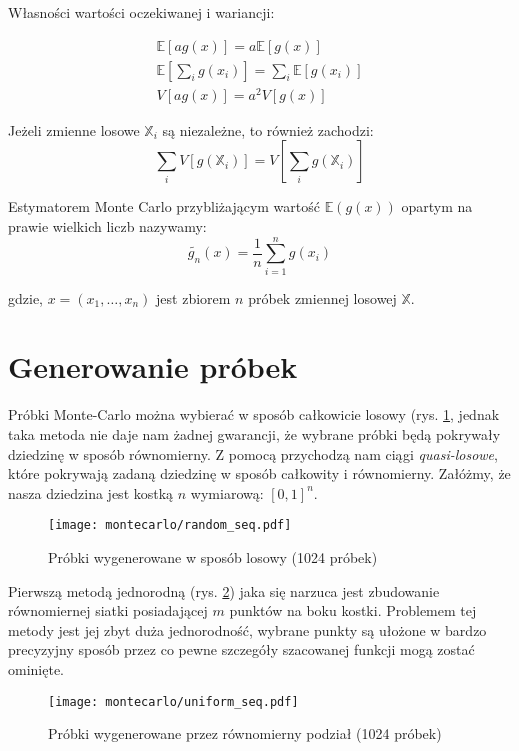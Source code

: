 \documentclass[../main.tex]{subfiles}
\begin{document}
Własności wartości oczekiwanej i wariancji:

\begin{gather*}
\mathbb{E}\left[ag(x)\right] = a \mathbb{E} \left[g(x)\right] \\
\mathbb{E}\left[\sum_{i} g(x_i)\right] = \sum_{i} \mathbb{E} \left[g(x_i)\right] \\
V\left[ ag(x) \right] = a^2 V\left[g(x)\right]
\end{gather*}

Jeżeli zmienne losowe $\mathbb{X}_i$ są niezależne, to również zachodzi:
\[
\sum_{i} V \left[
	g(\mathbb{X}_i)
\right]
=
V \left[
	\sum_{i} g(\mathbb{X}_i)
\right]
\]

Estymatorem Monte Carlo przybliżającym wartość $\mathbb{E}(g(x))$ opartym na
prawie wielkich liczb nazywamy:
\[
\widetilde{g_n}(x) =
	\frac{1}{n}
	\sum_{i=1}^{n}g(x_i)
\]

\noindent gdzie, $x=(x_1, \ldots, x_n)$ jest zbiorem $n$ próbek zmiennej
losowej $\mathbb{X}$.

\section{Generowanie próbek}

Próbki Monte-Carlo można wybierać w sposób całkowicie losowy (rys.
\ref{fig:RandomSamples}, jednak taka metoda nie daje nam żadnej gwarancji, że
wybrane próbki będą pokrywały dziedzinę w sposób równomierny. Z pomocą
przychodzą nam ciągi \textit{quasi-losowe}, które pokrywają zadaną dziedzinę w
sposób całkowity i równomierny. Załóżmy, że nasza dziedzina jest kostką $n$
wymiarową: $[0,1]^{n}$.

\begin{figure}[h]
  \centering
  \texttt{[image: montecarlo/random\_seq.pdf]}
  \caption{Próbki wygenerowane w sposób losowy (1024 próbek)}
  \label{fig:RandomSamples}
\end{figure}

Pierwszą metodą jednorodną (rys. \ref{fig:UniformSamples}) jaka się narzuca jest zbudowanie równomiernej siatki posiadającej $m$ punktów na boku kostki. Problemem tej metody jest jej zbyt duża jednorodność, wybrane punkty są ułożone w bardzo precyzyjny sposób przez co pewne szczegóły szacowanej funkcji mogą zostać ominięte.

\begin{figure}[h]
  \centering
  \texttt{[image: montecarlo/uniform\_seq.pdf]}
  \caption{Próbki wygenerowane przez równomierny podział (1024 próbek)}
  \label{fig:UniformSamples}
\end{figure}
\end{document}

